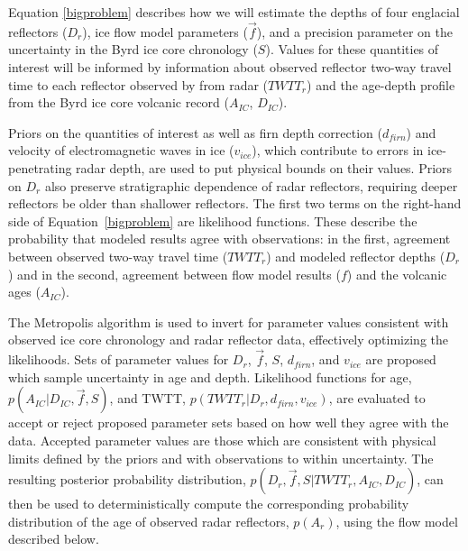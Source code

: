 Equation \ref{bigproblem} describes how we will estimate the depths of four englacial reflectors ($D_r$), ice flow model parameters ($\vec{f}$), and a precision parameter on the uncertainty in the Byrd ice core chronology ($S$). Values for these quantities of interest will be informed by  information about observed reflector two-way travel time to each reflector observed by from radar ($TWTT_r$) and the age-depth profile from the Byrd ice core volcanic record ($A_{IC}$, $D_{IC}$). 

Priors on the quantities of interest as well as firn depth correction ($d_{firn}$) and velocity of electromagnetic waves in ice ($v_{ice}$), which contribute to errors in ice-penetrating radar depth, are used to put physical bounds on their values. Priors on ${D_r}$ also preserve stratigraphic dependence of radar reflectors, requiring deeper reflectors be older than shallower reflectors. The first two terms on the right-hand side of Equation~\ref{bigproblem} are likelihood functions. These describe the probability that modeled results agree with observations: in the first, agreement between observed two-way travel time ($TWTT_r$) and modeled reflector depths ($D_r$) and in the second, agreement between flow model results ($f$) and the volcanic ages ($A_{IC}$). 

The Metropolis algorithm is used to invert for parameter values consistent with observed ice core chronology and radar reflector data, effectively optimizing the likelihoods. Sets of parameter values for $D_r$, $\vec{f}$, $S$, $d_{firn}$, and $v_{ice}$ are proposed which sample uncertainty in age and depth. %
Likelihood functions for age, $p(A_{IC} | D_{IC},\vec{f},S)$, and TWTT, $p(TWTT_r | D_r,d_{firn},v_{ice})$, are evaluated to accept or reject proposed parameter sets based on how well they agree with the data. Accepted parameter values are those which are consistent with physical limits defined by the priors and with observations to within uncertainty. The resulting posterior probability distribution, $p(D_r, \vec{f},S | TWTT_r, A_{IC}, D_{IC})$, can then be used to deterministically compute the corresponding probability distribution of the age of observed radar reflectors, $p(A_r)$, using the flow model described below.



\label{radardepth}

%



